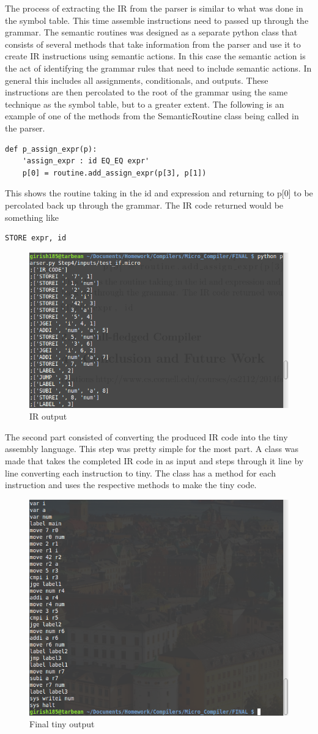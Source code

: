\documentclass[12pt, oneside]{article}   	%
\begin{document}
The process of extracting the IR from the parser is similar to what was done in the symbol table. This time assemble instructions need to passed up through the grammar.  The semantic routines was designed as a separate python class that consists of several methods that take information from the parser and use it to create IR instructions using semantic actions.\cite{book} In this case the semantic action is the act of identifying the grammar rules that need to include semantic actions. In general this includes all assignments, conditionals, and outputs. These instructions are then percolated to the root of the grammar using the same technique as the symbol table, but to a greater extent. The following is an example of one of the methods from the SemanticRoutine class being called in the parser.
\begin{lstlisting}
def p_assign_expr(p):
	'assign_expr : id EQ_EQ expr'
	p[0] = routine.add_assign_expr(p[3], p[1])
\end{lstlisting}
This shows the routine taking in the id and expression and returning to p[0] to be percolated back up through the grammar. The IR code returned would be something like 
\begin{lstlisting}
STORE expr, id
\end{lstlisting}
\begin{figure}[h!]
	\centerline{\includegraphics[width=.4\linewidth]{pics/ir}}
	\caption{IR output}
\end{figure}

The second part consisted of converting the produced IR code into the tiny assembly language. This step was pretty simple for the most part. A class was made that takes the completed IR code in as input and steps through it line by line converting each instruction to tiny. The class has a method for each instruction and uses the respective methods to make the tiny code. 
\begin{figure}[h!]
	\centerline{\includegraphics[width=.4\linewidth]{pics/tiny}}
	\caption{Final tiny output}
\end{figure}
\end{document}
